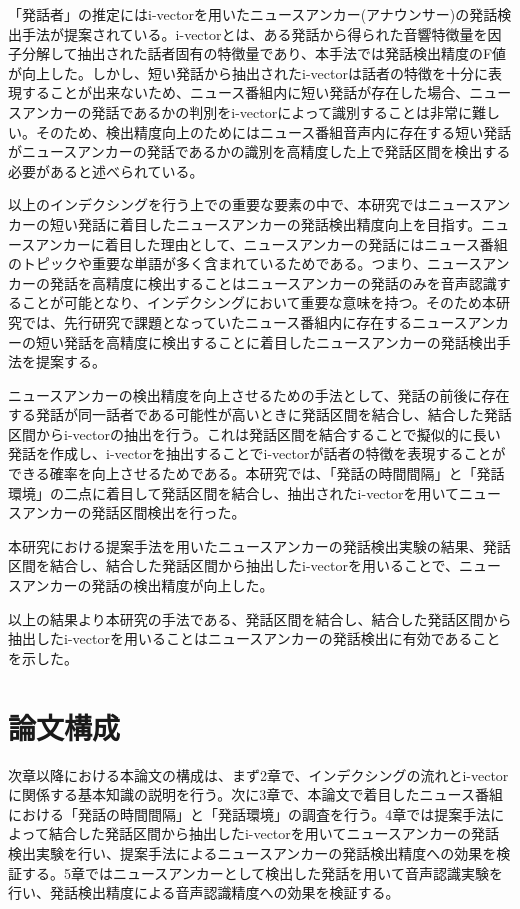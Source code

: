 「発話者」の推定にはi-vector\cite{iv}を用いたニュースアンカー(アナウンサー)の発話検出手法\cite{nozaki_gakuseikai}が提案されている。i-vectorとは、ある発話から得られた音響特徴量を因子分解して抽出された話者固有の特徴量であり、本手法では発話検出精度のF値が向上した。しかし、短い発話から抽出されたi-vectorは話者の特徴を十分に表現することが出来ないため\cite{panaiv}、ニュース番組内に短い発話が存在した場合、ニュースアンカーの発話であるかの判別をi-vectorによって識別することは非常に難しい。そのため、検出精度向上のためにはニュース番組音声内に存在する短い発話がニュースアンカーの発話であるかの識別を高精度した上で発話区間を検出する必要があると述べられている。\par

以上のインデクシングを行う上での重要な要素の中で、本研究ではニュースアンカーの短い発話に着目したニュースアンカーの発話検出精度向上を目指す。ニュースアンカーに着目した理由として、ニュースアンカーの発話にはニュース番組のトピックや重要な単語が多く含まれているためである。つまり、ニュースアンカーの発話を高精度に検出することはニュースアンカーの発話のみを音声認識することが可能となり、インデクシングにおいて重要な意味を持つ。そのため本研究では、先行研究\cite{nozaki_gakuseikai}で課題となっていたニュース番組内に存在するニュースアンカーの短い発話を高精度に検出することに着目したニュースアンカーの発話検出手法を提案する。\par

ニュースアンカーの検出精度を向上させるための手法として、発話の前後に存在する発話が同一話者である可能性が高いときに発話区間を結合し、結合した発話区間からi-vectorの抽出を行う。これは発話区間を結合することで擬似的に長い発話を作成し、i-vectorを抽出することでi-vectorが話者の特徴を表現することができる確率を向上させるためである。本研究では、「発話の時間間隔」と「発話環境」の二点に着目して発話区間を結合し、抽出されたi-vectorを用いてニュースアンカーの発話区間検出を行った。\par

本研究における提案手法を用いたニュースアンカーの発話検出実験の結果、発話区間を結合し、結合した発話区間から抽出したi-vectorを用いることで、ニュースアンカーの発話の検出精度が向上した。\par

以上の結果より本研究の手法である、発話区間を結合し、結合した発話区間から抽出したi-vectorを用いることはニュースアンカーの発話検出に有効であることを示した。

\section{論文構成}
次章以降における本論文の構成は、まず2章で、インデクシングの流れとi-vectorに関係する基本知識の説明を行う。次に3章で、本論文で着目したニュース番組における「発話の時間間隔」と「発話環境」の調査を行う。4章では提案手法によって結合した発話区間から抽出したi-vectorを用いてニュースアンカーの発話検出実験を行い、提案手法によるニュースアンカーの発話検出精度への効果を検証する。5章ではニュースアンカーとして検出した発話を用いて音声認識実験を行い、発話検出精度による音声認識精度への効果を検証する。

